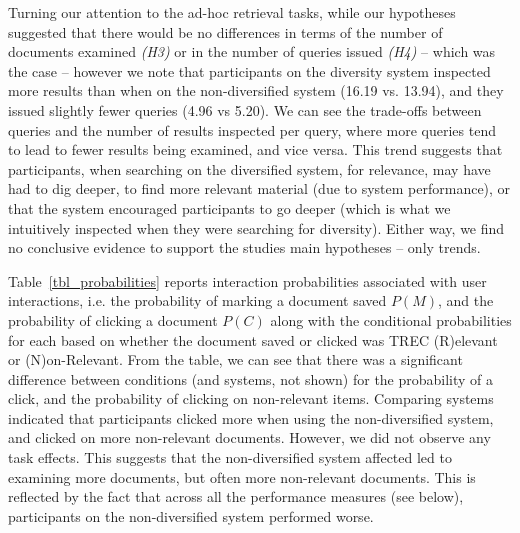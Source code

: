 Turning our attention to the ad-hoc retrieval tasks, while our hypotheses suggested that there would be no differences in terms of the number of documents examined \emph{(H3)} or in the number of queries issued \emph{(H4)} -- which was the case -- however we note that participants on the diversity system inspected more results than when on the non-diversified system (16.19 vs. 13.94), and they issued slightly fewer queries (4.96 vs 5.20). We can see the trade-offs between queries and the number of results inspected per query, where more queries tend to lead to fewer results being examined, and vice versa. This trend suggests that participants, when searching on the diversified system, for relevance, may have had to dig deeper, to find more relevant material (due to system performance), or that the system encouraged participants to go deeper (which is what we intuitively inspected when they were searching for diversity). Either way, we find no conclusive evidence to support the studies main hypotheses -- only trends. 

Table~\ref{tbl_probabilities} reports interaction probabilities associated with user interactions, i.e. the probability of marking a document saved $P(M)$, and the probability of clicking a document $P(C)$ along with the conditional probabilities for each based on whether the document saved or clicked was TREC (R)elevant or (N)on-Relevant. From the table, we can see that there was a significant difference between conditions (and systems, not shown) for the probability of a click, and the probability of clicking on non-relevant items. Comparing systems indicated that participants clicked more when using the non-diversified system, and clicked on more non-relevant documents. However, we did not observe any task effects. This suggests that the non-diversified system affected led to examining more documents, but often more non-relevant documents. This is reflected by the fact that across all the performance measures (see below), participants on the non-diversified system performed worse.

